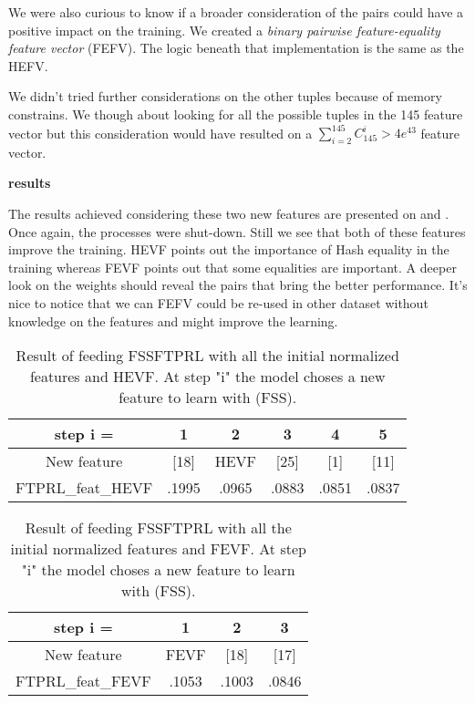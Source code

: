 			We were also curious to know if a broader consideration of the pairs could have a positive impact on the training. We created a \textit{binary pairwise feature-equality feature vector} (FEFV). The logic beneath that implementation is the same as the HEFV. 

			We didn't tried further considerations on the other tuples because of memory constrains. We though about looking for all the possible tuples in the 145 feature vector but this consideration would have resulted on a $\sum_{i=2}^{145} C_{145}^i > 4e^{43}$ feature vector.

			\vspace{\baselineskip}
			\textbf{results}
			
			The results achieved considering these two new features are presented on  and . Once again, the processes were shut-down. Still we see that both of these features improve the training. HEVF points out the importance of Hash equality in the training whereas FEVF points out that some equalities are important. A deeper look on the weights should reveal the pairs that bring the better performance. It's nice to notice that we can FEFV could be re-used in other dataset without knowledge on the features and might improve the learning.

			\begin{table}
				\centering
				\begin{tabular}{c|c|c|c|c|c}
					step i = & 1 & 2 & 3 & 4 & 5 \\
					\hline
					New feature 		& [18] & HEVF & [25] & [1] & [11] \\
					FTPRL\_feat\_HEVF	&  .1995 & .0965 & .0883 & .0851 & .0837 \\
				\end{tabular}
				\caption{Result of feeding FSSFTPRL with all the initial normalized features and HEVF. At step "i" the model choses a new feature to learn with (FSS).  }
				\label{tab:FTPRL_feat_HEVF}
			\end{table}

			\begin{table}
				\centering
				\begin{tabular}{c|c|c|c}
					step i = & 1 & 2 & 3  \\
					\hline
					New feature 	&	FEVF & [18] & [17] \\
					FTPRL\_feat\_FEVF	&  .1053 & .1003 & .0846 \\
				\end{tabular}
				\caption{Result of feeding FSSFTPRL with all the initial normalized features and FEVF. At step "i" the model choses a new feature to learn with (FSS).  }
				\label{tab:FTPRL_feat_FEVF}
			\end{table}


